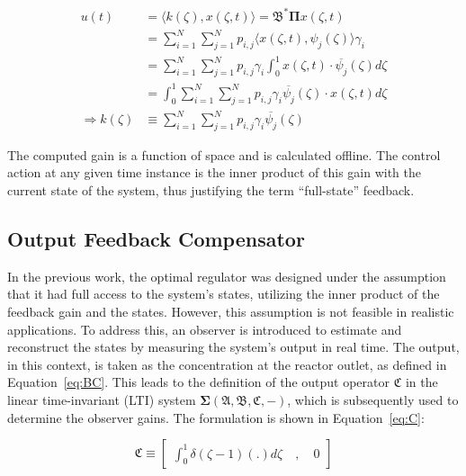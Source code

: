 \begin{equation} \label{eq:fullstate_gain}
    \begin{aligned}
        u(t) &= \langle k (\zeta), x(\zeta, t) \rangle = \mathfrak{B}^* \mathbf{\Pi} x(\zeta, t) \\
        &= \sum_{i=1}^N\sum_{j=1}^N p_{i,j} \langle x(\zeta, t), \psi_j(\zeta) \rangle \gamma_i \\
        &= \sum_{i=1}^N\sum_{j=1}^N p_{i,j} \gamma_i \int_0^1 x(\zeta, t) \cdot \overline{\psi_j}(\zeta) d\zeta \\
        &= \int_0^1 \sum_{i=1}^N\sum_{j=1}^N p_{i,j} \gamma_i \overline{\psi_j}(\zeta) \cdot x(\zeta, t) d\zeta \\
        \Rightarrow k(\zeta) &\equiv \sum_{i=1}^N\sum_{j=1}^N p_{i,j} \gamma_i \overline{\psi_j}(\zeta)
    \end{aligned}
\end{equation}

The computed gain is a function of space and is calculated offline. The control action at any given time instance is the inner product of this gain with the current state of the system, thus justifying the term ``full-state'' feedback.

\subsection{Output Feedback Compensator}

In the previous work, the optimal regulator was designed under the assumption that it had full access to the system's states, utilizing the inner product of the feedback gain and the states. However, this assumption is not feasible in realistic applications. To address this, an observer is introduced to estimate and reconstruct the states by measuring the system's output in real time. The output, in this context, is taken as the concentration at the reactor outlet, as defined in Equation~\ref{eq:BC}. This leads to the definition of the output operator $\mathfrak{C}$ in the linear time-invariant (LTI) system $\mathbf{\Sigma(\mathfrak{A},\mathfrak{B},\mathfrak{C},-)}$, which is subsequently used to determine the observer gains. The formulation is shown in Equation~\ref{eq:C}:

\begin{equation} \label{eq:C}
    \mathfrak{C} \equiv \begin{bmatrix}
        \int_0^1 \delta(\zeta-1) (.) d\zeta \quad , \quad 0
    \end{bmatrix}
\end{equation}

